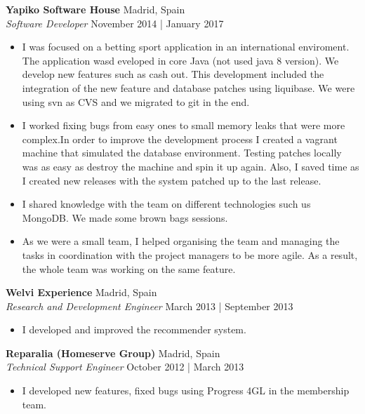 \documentclass[a4paper]{article}
\begin{document}
\textbf{Yapiko Software House} \hfill Madrid, Spain\\
\textit{Software Developer} \hfill November 2014 | January 2017\\
\vspace{-1mm}
\begin{itemize} \itemsep 1pt
	\item I was focused on a betting sport application in an international enviroment.  The application wasd eveloped in core Java (not used java 8 version).  We develop new features such as cash out.  This development included the integration of the new feature and database patches using liquibase. We were using svn as CVS and we migrated to git in the end.
	\item I worked fixing bugs from easy ones to small memory leaks that were more complex.In order to improve the development process I created a vagrant machine that simulated the database environment. Testing patches locally was as easy as destroy the machine and spin it up again. Also, I saved time as I created new releases with the system patched up to the last release.
	\item I shared knowledge with the team on different technologies such us MongoDB. We made some brown bags sessions.
	\item As we were a small team, I helped organising the team and managing the tasks in coordination with the project managers to be more agile. As a result, the whole team was working on the same feature.
\end{itemize}

\textbf{Welvi Experience} \hfill Madrid, Spain\\
\textit{Research and Development Engineer} \hfill March 2013 | September 2013\\
\vspace{-1mm}
\begin{itemize} \itemsep 1pt
	\item I developed and improved the recommender system.
\end{itemize}

\textbf{Reparalia (Homeserve Group)} \hfill Madrid, Spain\\
\textit{Technical Support Engineer} \hfill October 2012 | March 2013\\
\vspace{-1mm}
\begin{itemize} \itemsep 1pt
	\item I developed new features, fixed bugs using Progress 4GL in the membership team.
\end{itemize}
\end{document}
